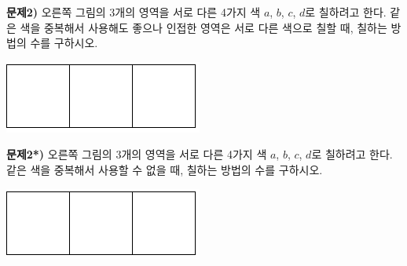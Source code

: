 \documentclass[a4paper]{oblivoir}
\begin{document}
\bigskip\noindent
%
\begin{minipage}{.65\textwidth}
\textbf{문제2)}
오른쪽 그림의 3개의 영역을 서로 다른 4가지 색 \(a\), \(b\), \(c\), \(d\)로 칠하려고 한다.
같은 색을 중복해서 사용해도 좋으나 인접한 영역은 서로 다른 색으로 칠할 때, 칠하는 방법의 수를 구하시오.
\end{minipage}
\quad
\begin{minipage}{.25\textwidth}
\includegraphics[width=.5\textwidth]{2}
\end{minipage}

\bigskip\noindent
%
\begin{minipage}{.65\textwidth}
\textbf{문제2*)}
오른쪽 그림의 3개의 영역을 서로 다른 4가지 색 \(a\), \(b\), \(c\), \(d\)로 칠하려고 한다.
같은 색을 중복해서 사용할 수 없을 때, 칠하는 방법의 수를 구하시오.
\end{minipage}
\quad
\begin{minipage}{.25\textwidth}
\includegraphics[width=.5\textwidth]{2}
\end{minipage}
\end{document}
